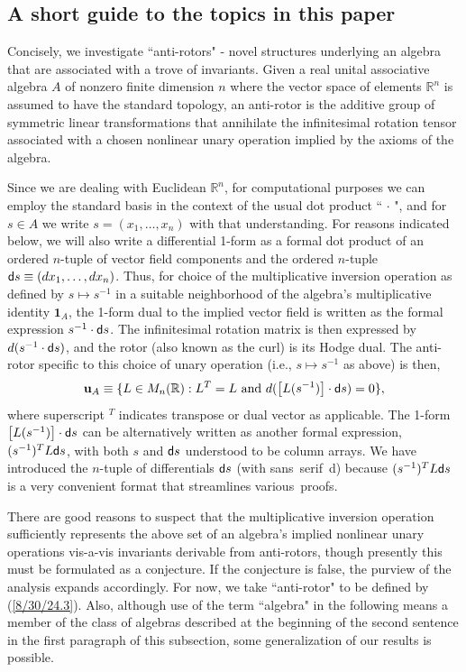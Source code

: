 \documentclass{amsart}
\numberwithin{equation}{section}
\theoremstyle{definition}
\numberwithin{theorem}{section}
\begin{document}
\subsection{A short guide to the topics in this paper} 
Concisely, we investigate ``anti-rotors" -  novel structures underlying an algebra that are associated with a trove of invariants.
Given a real unital associative algebra $A$ of nonzero finite dimension $n$ where the vector space of elements $\mathbb{R}^n$ is assumed to have the standard topology, an \mbox{anti-rotor} is the additive group of symmetric linear transformations that annihilate the infinitesimal rotation tensor associated with a chosen nonlinear unary operation implied by the axioms of the algebra.  

Since we are dealing with Euclidean $\mathbb{R}^n$, for computational purposes we can employ the standard basis in the context of the usual dot product `` $\cdot$ ", and for $s\in A$ we write $s=(x_1,\dots,x_n)$ with that understanding.  For reasons indicated below, we will also write a differential 1-form as a formal dot product of an ordered $n$-tuple of vector field components and the ordered $n$-tuple ${\sf d}s \equiv (dx_1,\dots, dx_n)$. Thus, for choice of the multiplicative inversion operation as defined by $s\mapsto s^{-1}$ in a suitable neighborhood of the algebra's multiplicative identity $\mathbf{1}_A$, the 1-form dual to the implied vector field is written as the formal expression $s^{-1}\cdot {\sf d}s$.  The infinitesimal rotation matrix is then expressed by $d(s^{-1}\cdot {\sf d}s)$, and the rotor (also known as the curl) is its Hodge dual. 
The anti-rotor specific to this choice of unary operation (i.e., $s\mapsto s^{-1}$ as above) is then,
\begin{equation}\label{8/30/24.3} \mathbf{u}_A \equiv \{L\in M_n(\mathbb{R}): L^T=L \text{ and } d(\left[L(s^{-1})\right]\cdot {\sf d}s)  = 0\},\end{equation}
where superscript $^T$ indicates transpose or dual vector as applicable.  The \mbox{1-form} $\left[L(s^{-1})\right]\cdot {\sf d}s$ can be alternatively written as another formal expression, $(s^{-1})^TL{\sf d}s$, with both $s$ and ${\sf d}s$ understood to be column arrays. 
We have introduced the \mbox{$n$-tuple} of differentials ${\sf d}s$ (with \mbox{sans serif {\sf d}}) because $(s^{-1})^TL{\sf d}s$ is a very convenient format that streamlines \mbox{various proofs}.  

There are good reasons to suspect that the multiplicative inversion operation sufficiently represents the above set of an algebra's implied nonlinear unary operations vis-a-vis invariants derivable from anti-rotors, though presently this must be formulated as a conjecture.  If the conjecture is false, the purview of the analysis expands accordingly.  For now, we take ``anti-rotor" to be defined by (\ref{8/30/24.3}).  Also, although use of the term ``algebra" in the following means a member of the class of algebras described at the beginning of the second sentence in the first paragraph of this subsection, some generalization of our results is possible.
\end{document}
